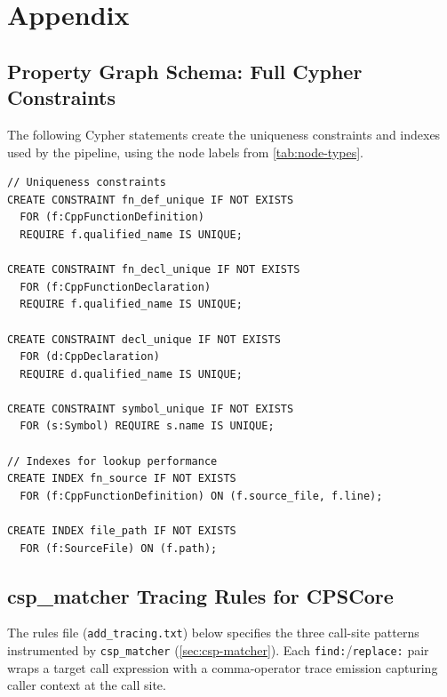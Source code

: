 \chapter{Appendix}\label{ch:appendix}

\section{Property Graph Schema: Full Cypher Constraints}
\label{sec:appendix-schema}

The following Cypher statements create the uniqueness constraints and
indexes used by the pipeline, using the node labels from
\cref{tab:node-types}.

\begin{verbatim}
// Uniqueness constraints
CREATE CONSTRAINT fn_def_unique IF NOT EXISTS
  FOR (f:CppFunctionDefinition)
  REQUIRE f.qualified_name IS UNIQUE;

CREATE CONSTRAINT fn_decl_unique IF NOT EXISTS
  FOR (f:CppFunctionDeclaration)
  REQUIRE f.qualified_name IS UNIQUE;

CREATE CONSTRAINT decl_unique IF NOT EXISTS
  FOR (d:CppDeclaration)
  REQUIRE d.qualified_name IS UNIQUE;

CREATE CONSTRAINT symbol_unique IF NOT EXISTS
  FOR (s:Symbol) REQUIRE s.name IS UNIQUE;

// Indexes for lookup performance
CREATE INDEX fn_source IF NOT EXISTS
  FOR (f:CppFunctionDefinition) ON (f.source_file, f.line);

CREATE INDEX file_path IF NOT EXISTS
  FOR (f:SourceFile) ON (f.path);
\end{verbatim}

\section{csp\_matcher Tracing Rules for CPSCore}
\label{sec:appendix-tracing-rules}

The rules file (\texttt{add\_tracing.txt}) below specifies the three
call-site patterns instrumented by \texttt{csp\_matcher}
(\cref{sec:csp-matcher}). Each \texttt{find:}/\texttt{replace:} pair
wraps a target call expression with a comma-operator trace emission
capturing caller context at the call site.


